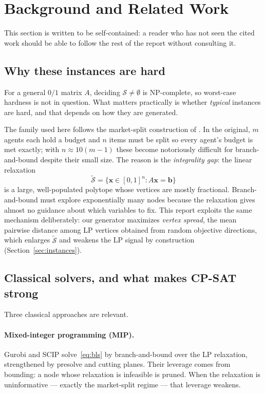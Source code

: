 \documentclass[12pt]{article}
\begin{document}
\section{Background and Related Work}
\label{sec:bg}

This section is written to be self-contained: a reader who has not seen the cited work should be able to follow the rest of the report without consulting it.

\subsection{Why these instances are hard}
\label{sec:whyhard}

For a general $0/1$ matrix $A$, deciding $\mathcal{S}\ne\emptyset$ is NP-complete, so worst-case hardness is not in question. What matters practically is whether \emph{typical} instances are hard, and that depends on how they are generated.

The family used here follows the market-split construction of \citet{cornuejols1999market}. In the original, $m$ agents each hold a budget and $n$ items must be split so every agent's budget is met exactly; with $n\approx 10(m-1)$ these become notoriously difficult for branch-and-bound despite their small size. The reason is the \emph{integrality gap}: the linear relaxation
\begin{equation}
\tilde{\mathcal{S}} = \{\mathbf{x}\in[0,1]^n : A\mathbf{x}=\mathbf{b}\}
\end{equation}
is a large, well-populated polytope whose vertices are mostly fractional. Branch-and-bound must explore exponentially many nodes because the relaxation gives almost no guidance about which variables to fix. This report exploits the same mechanism deliberately: our generator maximizes \emph{vertex spread}, the mean pairwise distance among LP vertices obtained from random objective directions, which enlarges $\tilde{\mathcal{S}}$ and weakens the LP signal by construction (Section~\ref{sec:instances}).

\subsection{Classical solvers, and what makes CP-SAT strong}
\label{sec:cpsat}

Three classical approaches are relevant.

\paragraph{Mixed-integer programming (MIP).} Gurobi and SCIP solve~\eqref{eq:bls} by branch-and-bound over the LP relaxation, strengthened by presolve and cutting planes. Their leverage comes from bounding: a node whose relaxation is infeasible is pruned. When the relaxation is uninformative --- exactly the market-split regime --- that leverage weakens.
\end{document}
